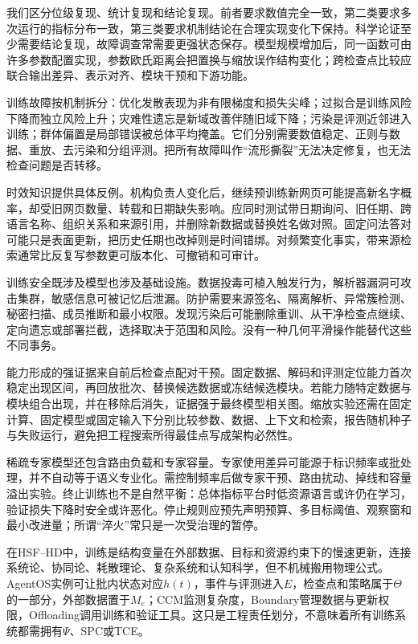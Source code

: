 我们区分位级复现、统计复现和结论复现。前者要求数值完全一致，第二类要求多次运行的指标分布一致，第三类要求机制结论在合理实现变化下保持。科学论证至少需要结论复现，故障调查常需要更强状态保存。模型规模增加后，同一函数可由许多参数配置实现，参数欧氏距离会把置换与缩放误作结构变化；跨检查点比较应联合输出差异、表示对齐、模块干预和下游功能。

训练故障按机制拆分：优化发散表现为非有限梯度和损失尖峰；过拟合是训练风险下降而独立风险上升；灾难性遗忘是新域改善伴随旧域下降；污染是评测近邻进入训练；群体偏置是局部错误被总体平均掩盖。它们分别需要数值稳定、正则与数据、重放、去污染和分组评测。把所有故障叫作“流形撕裂”无法决定修复，也无法检查问题是否转移。

时效知识提供具体反例。机构负责人变化后，继续预训练新网页可能提高新名字概率，却受旧网页数量、转载和日期缺失影响。应同时测试带日期询问、旧任期、跨语言名称、组织关系和来源引用，并删除新数据或替换姓名做对照。固定问法答对可能只是表面更新，把历史任期也改掉则是时间错绑。对频繁变化事实，带来源检索通常比反复写参数更可版本化、可撤销和可审计。

训练安全既涉及模型也涉及基础设施。数据投毒可植入触发行为，解析器漏洞可攻击集群，敏感信息可被记忆后泄漏。防护需要来源签名、隔离解析、异常簇检测、秘密扫描、成员推断和最小权限。发现污染后可能删除重训、从干净检查点继续、定向遗忘或部署拦截，选择取决于范围和风险。没有一种几何平滑操作能替代这些不同事务。

能力形成的强证据来自前后检查点配对干预。固定数据、解码和评测定位能力首次稳定出现区间，再回放批次、替换候选数据或冻结候选模块。若能力随特定数据与模块组合出现，并在移除后消失，证据强于最终模型相关图。缩放实验还需在固定计算、固定模型或固定输入下分别比较参数、数据、上下文和检索，报告随机种子与失败运行，避免把工程搜索所得最佳点写成架构必然性。

稀疏专家模型还包含路由负载和专家容量。专家使用差异可能源于标识频率或批处理，并不自动等于语义专业化。需控制频率后做专家干预、路由扰动、掉线和容量溢出实验。终止训练也不是自然平衡：总体指标平台时低资源语言或许仍在学习，验证损失下降时安全或许恶化。停止规则应预先声明预算、多目标阈值、观察窗和最小改进量；所谓“淬火”常只是一次受治理的暂停。

在HSF--HD中，训练是结构变量在外部数据、目标和资源约束下的慢速更新，连接系统论、协同论、耗散理论、复杂系统和认知科学，但不机械搬用物理公式。AgentOS实例可让批内状态对应$h(t)$，事件与评测进入$E$，检查点和策略属于$\Theta$的一部分，外部数据置于$M_e$；CCM监测复杂度，Boundary管理数据与更新权限，Offloading调用训练和验证工具。这只是工程责任划分，不意味着所有训练系统都需拥有$\Psi$、SPC或TCE。

